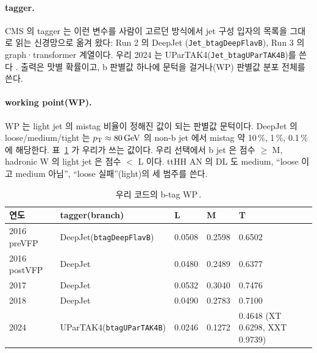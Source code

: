 \paragraph{tagger.}
CMS 의 tagger 는 이런 변수를 사람이 고르던 방식에서 jet 구성 입자의 목록을 그대로 읽는 신경망으로 옮겨 왔다: Run 2 의 DeepJet
(\texttt{Jet\_btagDeepFlavB}), Run 3 의 graph·transformer 계열이다. 우리 2024 는 UParTAK4(\texttt{Jet\_btagUParTAK4B})를 쓴다
. 출력은 맛별 확률이고, b 판별값 하나에 문턱을 걸거나(WP) 판별값 분포 전체를 쓴다.

\paragraph{working point(WP).}
WP 는 light jet 의 mistag 비율이 정해진 값이 되는 판별값 문턱이다. DeepJet 의 loose/medium/tight 는 $p_{\mathrm{T}}\approx80\,\mathrm{GeV}$ 의 non-b jet 에서
mistag 약 10\,\%, 1\,\%, 0.1\,\% 에 해당한다. 표~\ref{tab:btag-wp} 가 우리가 쓰는 값이다. 우리 선택에서
b jet 은 점수 $\geq$ M, hadronic W 의 light jet 은 점수 $<$ L 이다. ttHH AN 의 DL 도
medium, ``loose 이고 medium 아님'', ``loose 실패''(light)의 세 범주를 쓴다.

\begin{table}[htbp]
\caption{우리 코드의 b-tag WP\,.}
\label{tab:btag-wp}
\centering\small
\begin{tabular}{@{}lllll@{}}
\toprule
연도 & tagger(branch) & L & M & T \\
\midrule
2016 preVFP & DeepJet(\texttt{btagDeepFlavB}) & 0.0508 & 0.2598 & 0.6502 \\
2016 postVFP & DeepJet & 0.0480 & 0.2489 & 0.6377 \\
2017 & DeepJet & 0.0532 & 0.3040 & 0.7476 \\
2018 & DeepJet & 0.0490 & 0.2783 & 0.7100 \\
2024 & UParTAK4(\texttt{btagUParTAK4B}) & 0.0246 & 0.1272 & 0.4648 (XT 0.6298, XXT 0.9739) \\
\bottomrule
\end{tabular}
\end{table}


